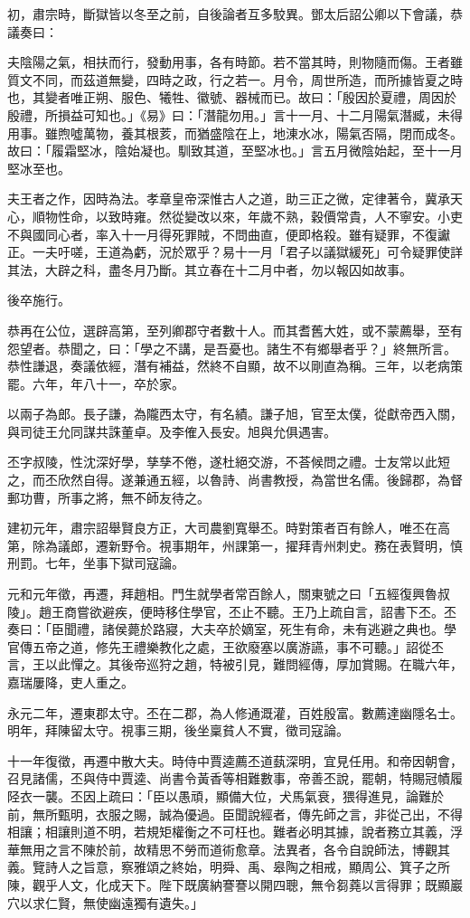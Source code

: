 \begin{pinyinscope}
初，肅宗時，斷獄皆以冬至之前，自後論者互多駮異。鄧太后詔公卿以下會議，恭議奏曰：

夫陰陽之氣，相扶而行，發動用事，各有時節。若不當其時，則物隨而傷。王者雖質文不同，而茲道無變，四時之政，行之若一。月令，周世所造，而所據皆夏之時也，其變者唯正朔、服色、犧牲、徽號、器械而已。故曰：「殷因於夏禮，周因於殷禮，所損益可知也。」《易》曰：「潛龍勿用。」言十一月、十二月陽氣潛臧，未得用事。雖煦噓萬物，養其根荄，而猶盛陰在上，地涷水冰，陽氣否隔，閉而成冬。故曰：「履霜堅冰，陰始凝也。馴致其道，至堅冰也。」言五月微陰始起，至十一月堅冰至也。

夫王者之作，因時為法。孝章皇帝深惟古人之道，助三正之微，定律著令，冀承天心，順物性命，以致時雍。然從變改以來，年歲不熟，穀價常貴，人不寧安。小吏不與國同心者，率入十一月得死罪賊，不問曲直，便即格殺。雖有疑罪，不復讞正。一夫吁嗟，王道為虧，況於眾乎？易十一月「君子以議獄緩死」可令疑罪使詳其法，大辟之科，盡冬月乃斷。其立春在十二月中者，勿以報囚如故事。

後卒施行。

恭再在公位，選辟高第，至列卿郡守者數十人。而其耆舊大姓，或不蒙薦舉，至有怨望者。恭聞之，曰：「學之不講，是吾憂也。諸生不有鄉舉者乎？」終無所言。恭性謙退，奏議依經，潛有補益，然終不自顯，故不以剛直為稱。三年，以老病策罷。六年，年八十一，卒於家。

以兩子為郎。長子謙，為隴西太守，有名績。謙子旭，官至太僕，從獻帝西入關，與司徒王允同謀共誅董卓。及李傕入長安。旭與允俱遇害。

丕字叔陵，性沈深好學，孳孳不倦，遂杜絕交游，不荅候問之禮。士友常以此短之，而丕欣然自得。遂兼通五經，以魯詩、尚書教授，為當世名儒。後歸郡，為督郵功曹，所事之將，無不師友待之。

建初元年，肅宗詔舉賢良方正，大司農劉寬舉丕。時對策者百有餘人，唯丕在高第，除為議郎，遷新野令。視事期年，州課第一，擢拜青州刺史。務在表賢明，慎刑罰。七年，坐事下獄司寇論。

元和元年徵，再遷，拜趙相。門生就學者常百餘人，關東號之曰「五經復興魯叔陵」。趙王商嘗欲避疾，便時移住學官，丕止不聽。王乃上疏自言，詔書下丕。丕奏曰：「臣聞禮，諸侯薨於路寢，大夫卒於嫡室，死生有命，未有逃避之典也。學官傳五帝之道，修先王禮樂教化之處，王欲廢塞以廣游讌，事不可聽。」詔從丕言，王以此憚之。其後帝巡狩之趙，特被引見，難問經傳，厚加賞賜。在職六年，嘉瑞屢降，吏人重之。

永元二年，遷東郡太守。丕在二郡，為人修通溉灌，百姓殷富。數薦達幽隱名士。明年，拜陳留太守。視事三期，後坐稟貧人不實，徵司寇論。

十一年復徵，再遷中散大夫。時侍中賈逵薦丕道蓺深明，宜見任用。和帝因朝會，召見諸儒，丕與侍中賈逵、尚書令黃香等相難數事，帝善丕說，罷朝，特賜冠幘履陉衣一襲。丕因上疏曰：「臣以愚頑，顯備大位，犬馬氣衰，猥得進見，論難於前，無所甄明，衣服之賜，誠為優過。臣聞說經者，傳先師之言，非從己出，不得相讓；相讓則道不明，若規矩權衡之不可枉也。難者必明其據，說者務立其義，浮華無用之言不陳於前，故精思不勞而道術愈章。法異者，各令自說師法，博觀其義。覽詩人之旨意，察雅頌之終始，明舜、禹、皋陶之相戒，顯周公、箕子之所陳，觀乎人文，化成天下。陛下既廣納謇謇以開四聰，無令芻蕘以言得罪；既顯巖穴以求仁賢，無使幽遠獨有遺失。」


\end{pinyinscope}
